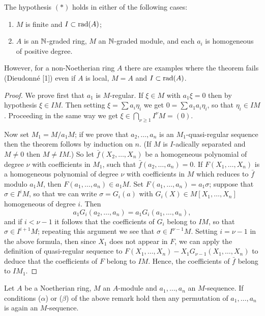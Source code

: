 \begin{remark}
The hypothesis $(*)$ holds in either of the following cases:
\begin{enumerate}[($\beta$)]
  \item $M$ is finite and $I \subset \operatorname{rad}(A)$;
  \item $A$ is an $\mathbb{N}$-graded ring, $M$ an $\mathbb{N}$-graded module, and each $a_i$ is
        homogeneous of positive degree.
\end{enumerate}
However, for a non-Noetherian ring $A$ there are examples where the
theorem fails (Dieudonn\'e [1]) even if $A$ is local, $M = A$ and $I \subset \operatorname{rad}(A)$.
\end{remark}

\begin{proof}
We prove first that $a_1$ is $M$-regular. If $\xi \in M$ with $a_1\xi = 0$ then
by hypothesis $\xi \in IM$. Then setting $\xi = \sum a_i\eta_i$ we get $0 = \sum a_1a_i\eta_i$, so that
$\eta_i \in IM$. Proceeding in the same way we get $\xi \in \bigcap_{\nu \ge 1} I^\nu M = (0)$.

Now set $M_1 = M/a_1M$; if we prove that $a_2, \ldots, a_n$ is an $M_1$-quasi-regular
sequence then the theorem follows by induction on $n$. (If $M$ is $I$-adically
separated and $M \neq 0$ then $M \neq IM$.) So let $\bar{f}(X_2, \ldots, X_n)$ be a homogeneous
polynomial of degree $\nu$ with coefficients in $M_1$, such that $\bar{f}(a_2, \ldots, a_n) = 0$.
If $F(X_1, \ldots, X_n)$ is a homogeneous polynomial of degree $\nu$ with coefficients
in $M$ which reduces to $\bar{f}$ modulo $a_1M$, then $F(a_1, \ldots, a_n) \in a_1M$. Set
$F(a_1, \ldots, a_n) = a_1\sigma$; suppose that $\sigma \in I^iM$, so that we can write $\sigma = G_i(a)$
with $G_i(X) \in M[X_1, \ldots, X_n]$ homogeneous of degree $i$. Then
\[
  a_1G_i(a_2, \ldots, a_n) = a_1G_i(a_1, \ldots, a_n),
\]
and if $i < \nu - 1$ it follows that the coefficients of $G_i$ belong to $IM$, so that
$\sigma \in I^{i+1}M$; repeating this argument we see that $\sigma \in I^{\nu-1}M$. Setting $i = \nu - 1$
in the above formula, then since $X_1$ does not appear in $F$, we can
apply the definition of quasi-regular sequence to $F(X_1, \ldots, X_n) -
X_1G_{\nu-1}(X_1, \ldots, X_n)$ to deduce that the coefficients of $F$ belong to $IM$.
Hence, the coefficients of $\bar{f}$ belong to $IM_1$.
\end{proof}

\begin{corollary*}
Let $A$ be a Noetherian ring, $M$ an $A$-module and $a_1, \ldots, a_n$
an $M$-sequence. If conditions ($\alpha$) or ($\beta$) of the above remark hold then any
permutation of $a_1, \ldots, a_n$ is again an $M$-sequence.
\end{corollary*}

